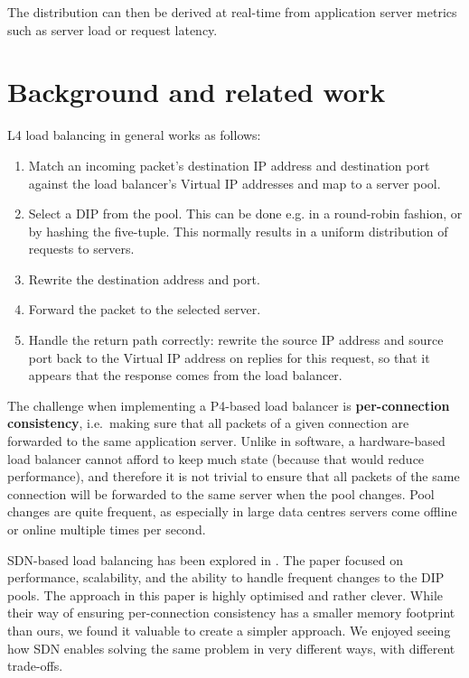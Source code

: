 \documentclass[11pt,oneside,a4paper]{article}
\begin{document}
The distribution can then be derived at real-time from application server
metrics such as server load or request latency.

\section{Background and related work}
L4 load balancing in general works as follows:

\begin{enumerate}
\item Match an incoming packet's destination IP address and destination port
    against the load balancer's Virtual IP addresses and map to a server pool.
\item Select a DIP from the pool.
    This can be done e.g. in a round-robin fashion, or by hashing the five-tuple.
    This normally results in a uniform distribution of requests to servers.
\item Rewrite the destination address and port.
\item Forward the packet to the selected server.
\item Handle the return path correctly: rewrite the source IP address and source
    port back to the Virtual IP address on replies for this request, so that
    it appears that the response comes from the load balancer.
\end{enumerate}

The challenge when implementing a P4-based load balancer is
\textbf{per-connection consistency}, i.e.~making sure that all packets of a
given connection are forwarded to the same application server.
Unlike in software, a hardware-based load balancer cannot afford to keep much
state (because that would reduce performance), and therefore it is not trivial
to ensure that all packets of the same connection will be forwarded to the same
server when the pool changes.
Pool changes are quite frequent, as especially in large data centres servers
come offline or online multiple times per second.\cite{googleinfra}

SDN-based load balancing has been explored in \cite{silkroad}.
The paper focused on performance, scalability, and the ability to handle
frequent changes to the DIP pools.
The approach in this paper is highly optimised and rather clever.
While their way of ensuring per-connection consistency has a smaller memory
footprint than ours, we found it valuable to create a simpler approach.
We enjoyed seeing how SDN enables solving the same problem in very different
ways, with different trade-offs.
\end{document}
